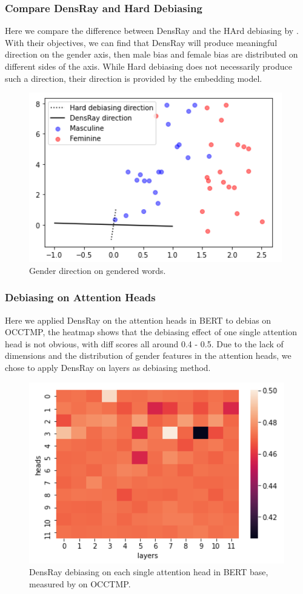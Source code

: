 \subsubsection{Compare DensRay and Hard Debiasing}
Here we compare the difference between DensRay and the HArd debiasing by \citep{mu2018all}. With their objectives, we can find that DensRay will produce meaningful direction on the gender axis, then male bias and female bias are distributed on different sides of the axis. While Hard debiasing does not necessarily produce such a direction, their direction is provided by the embedding model.
\begin{figure}[h]
	\centering
	\includegraphics[width=0.9\linewidth]{example.png}
	\caption{Gender direction on gendered words.}
\end{figure}
\subsubsection{Debiasing on Attention Heads}
Here we applied DensRay on the attention heads in BERT to debias on OCCTMP, the heatmap  shows that the debiasing effect of one single attention head is not obvious, with diff scores all around 0.4 - 0.5. Due to the lack of dimensions and the distribution of gender features in the attention heads, we chose to apply DensRay on layers as debiasing method.
\begin{figure}[h]
	\centering
	\includegraphics[width=0.9\linewidth]{heatmap_heads}
	\caption{DensRay debiasing on each single attention head in BERT base, measured by  on OCCTMP.}
\end{figure}


